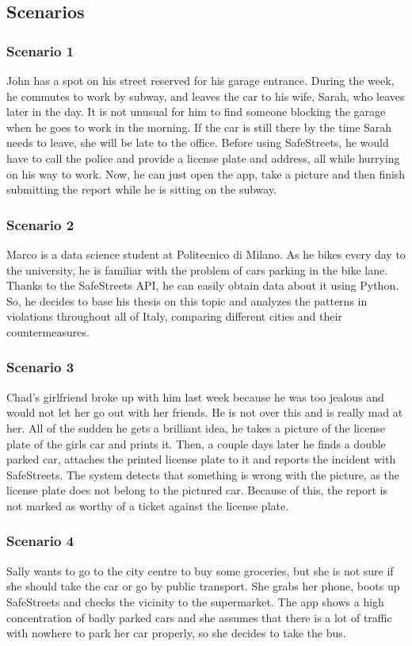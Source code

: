 \subsection{Scenarios}
\subsubsection{Scenario 1}
John has a spot on his street reserved for his garage entrance. During the week, he commutes to work by subway, and leaves the car to his wife, Sarah, who leaves later in the day. It is not unusual for him to find someone blocking the garage when he goes to work in the morning. If the car is still there by the time Sarah needs to leave, she will be late to the office. 
Before using SafeStreets, he would have to call the police and provide a license plate and address, all while hurrying on his way to work. Now, he can just open the app, take a picture and then finish submitting the report while he is sitting on the subway.

\subsubsection{Scenario 2}
Marco is a data science student at Politecnico di Milano. As he bikes every day to the university, he is familiar with the problem of cars parking in the bike lane. Thanks to the SafeStreets API, he can easily obtain data about it using Python. So, he decides to base his thesis on this topic and analyzes the patterns in violations throughout all of Italy, comparing different cities and their countermeasures.

\subsubsection{Scenario 3}
Chad’s girlfriend broke up with him last week because he was too jealous and would not let her go out with her friends. He is not over this and is really mad at her. All of the sudden he gets a brilliant idea, he takes a picture of the license plate of the girls car and prints it. Then, a couple days later he finds a double parked car, attaches the printed license plate to it and reports the incident with SafeStreets. 
The system detects that something is wrong with the picture, as the license plate does not belong to the pictured car. Because of this, the report is not marked as worthy of a ticket against the license plate.

\subsubsection{Scenario 4}
Sally wants to go to the city centre to buy some groceries, but she is not sure if she should take the car or go by public transport. She grabs her phone, boots up SafeStreets and checks the vicinity to the supermarket. The app shows a high concentration of badly parked cars and she assumes that there is a lot of traffic with nowhere to park her car properly, so she decides to take the bus.

